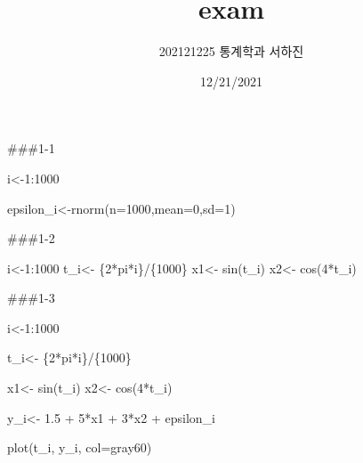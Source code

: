 \documentclass[
]{article}
\title{exam}
\author{202121225 통계학과 서하진}
\date{12/21/2021}
\newenvironment{Shaded}{\begin{snugshade}}{\end{snugshade}}
\newcommand{\AttributeTok}[1]{\textcolor[rgb]{0.77,0.63,0.00}{#1}}
\newcommand{\DecValTok}[1]{\textcolor[rgb]{0.00,0.00,0.81}{#1}}
\newcommand{\FloatTok}[1]{\textcolor[rgb]{0.00,0.00,0.81}{#1}}
\newcommand{\FunctionTok}[1]{\textcolor[rgb]{0.00,0.00,0.00}{#1}}
\newcommand{\NormalTok}[1]{#1}
\newcommand{\OtherTok}[1]{\textcolor[rgb]{0.56,0.35,0.01}{#1}}
\newcommand{\SpecialCharTok}[1]{\textcolor[rgb]{0.00,0.00,0.00}{#1}}
\newcommand{\StringTok}[1]{\textcolor[rgb]{0.31,0.60,0.02}{#1}}
\begin{document}
\maketitle

\#\#\#1-1

\begin{Shaded}
\begin{Highlighting}[]
\NormalTok{i}\OtherTok{\textless{}{-}}\DecValTok{1}\SpecialCharTok{:}\DecValTok{1000}


\NormalTok{epsilon\_i}\OtherTok{\textless{}{-}}\FunctionTok{rnorm}\NormalTok{(}\AttributeTok{n=}\DecValTok{1000}\NormalTok{,}\AttributeTok{mean=}\DecValTok{0}\NormalTok{,}\AttributeTok{sd=}\DecValTok{1}\NormalTok{)}
\end{Highlighting}
\end{Shaded}

\#\#\#1-2

\begin{Shaded}
\begin{Highlighting}[]
\NormalTok{i}\OtherTok{\textless{}{-}}\DecValTok{1}\SpecialCharTok{:}\DecValTok{1000}
\NormalTok{t\_i}\OtherTok{\textless{}{-}}\NormalTok{ \{}\DecValTok{2}\SpecialCharTok{*}\NormalTok{pi}\SpecialCharTok{*}\NormalTok{i\}}\SpecialCharTok{/}\NormalTok{\{}\DecValTok{1000}\NormalTok{\}}
\NormalTok{x1}\OtherTok{\textless{}{-}} \FunctionTok{sin}\NormalTok{(t\_i)}
\NormalTok{x2}\OtherTok{\textless{}{-}} \FunctionTok{cos}\NormalTok{(}\DecValTok{4}\SpecialCharTok{*}\NormalTok{t\_i)}
\end{Highlighting}
\end{Shaded}

\#\#\#1-3

\begin{Shaded}
\begin{Highlighting}[]
\NormalTok{i}\OtherTok{\textless{}{-}}\DecValTok{1}\SpecialCharTok{:}\DecValTok{1000}

\NormalTok{t\_i}\OtherTok{\textless{}{-}}\NormalTok{ \{}\DecValTok{2}\SpecialCharTok{*}\NormalTok{pi}\SpecialCharTok{*}\NormalTok{i\}}\SpecialCharTok{/}\NormalTok{\{}\DecValTok{1000}\NormalTok{\}}

\NormalTok{x1}\OtherTok{\textless{}{-}} \FunctionTok{sin}\NormalTok{(t\_i)}
\NormalTok{x2}\OtherTok{\textless{}{-}} \FunctionTok{cos}\NormalTok{(}\DecValTok{4}\SpecialCharTok{*}\NormalTok{t\_i)}

\NormalTok{y\_i}\OtherTok{\textless{}{-}} \FloatTok{1.5} \SpecialCharTok{+} \DecValTok{5}\SpecialCharTok{*}\NormalTok{x1 }\SpecialCharTok{+} \DecValTok{3}\SpecialCharTok{*}\NormalTok{x2 }\SpecialCharTok{+}\NormalTok{ epsilon\_i}

\FunctionTok{plot}\NormalTok{(t\_i, y\_i, }\AttributeTok{col=}\StringTok{\textquotesingle{}gray60\textquotesingle{}}\NormalTok{)}
\end{Highlighting}
\end{Shaded}
\end{document}
